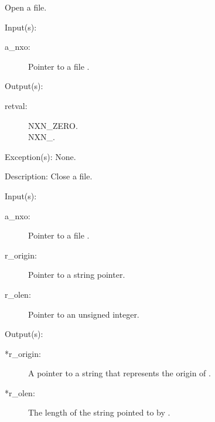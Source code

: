 \begin{capi}
\begin{capilist}
		Open a file.
	\end{capilist}
\label{nxo_file_close}
	\begin{capilist}
	\item[Input(s): ]
		\begin{description}\item[]
		\item[a\_nxo: ]
			Pointer to a file .
		\end{description}
	\item[Output(s): ]
		\begin{description}\item[]
		\item[retval: ]
			\begin{description}\item[]
			\item[NXN\_ZERO.]
			\item[NXN\_.]
			\end{description}
		\end{description}
	\item[Exception(s): ] None.
	\item[Description: ]
		Close a file.
	\end{capilist}
\label{nxo_file_origin_get}
	\begin{capilist}
	\item[Input(s): ]
		\begin{description}\item[]
		\item[a\_nxo: ]
			Pointer to a file \classname{nxo}.
		\item[r\_origin: ] Pointer to a string pointer.
		\item[r\_olen: ] Pointer to an unsigned integer.
		\end{description}
	\item[Output(s): ]
		\begin{description}\item[]
		\item[*r\_origin: ]
			A pointer to a string that represents the origin of
			\cvar{a\_nxo}.
		\item[*r\_olen: ]
			The length of the string pointed to by
			\cvar{*r\_origin}.
		\end{description}

\end{capilist}
\end{capi}
